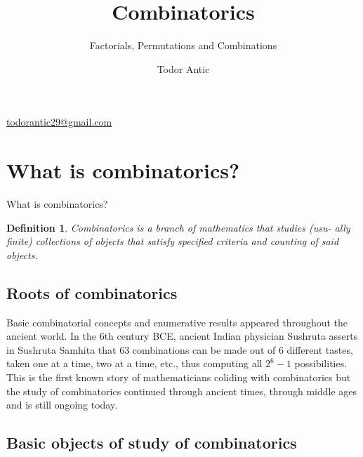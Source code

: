 \documentclass[11pt]{beamer}
\newtheorem{defn}{Definition}
\begin{document}
	\author{Todor Antic}
	\title{Combinatorics}
	\subtitle{Factorials, Permutations and Combinations}
	\begin{frame}[plain]
		\maketitle
		\begin{center}
			\url{todorantic29@gmail.com}
		\end{center}	
	\end{frame}
	\begin{frame}
		\tableofcontents
	\end{frame}
	\section{What is combinatorics?}
	\begin{frame}{What is combinatorics?}
		\begin{defn}
			Combinatorics is a branch of mathematics that studies (usu-
			ally finite) collections of objects that satisfy specified criteria and \alert{counting} of said objects. 
		\end{defn}
		
	\end{frame}


	\subsection{Roots of combinatorics}
	\begin{frame}
		Basic combinatorial concepts and enumerative results appeared throughout the ancient world. In the 6th century BCE, ancient Indian physician Sushruta asserts in Sushruta Samhita that 63 combinations can be made out of 6 different tastes, taken one at a time, two at a time, etc., thus computing all $2^6 - 1$ possibilities. This is the first known story of mathematicians coliding with combinatorics but the study of combinatorics continued through ancient times, through middle ages and is still ongoing today.
	\end{frame}



	\subsection {Basic objects of study of combinatorics}
	
\end{document}
